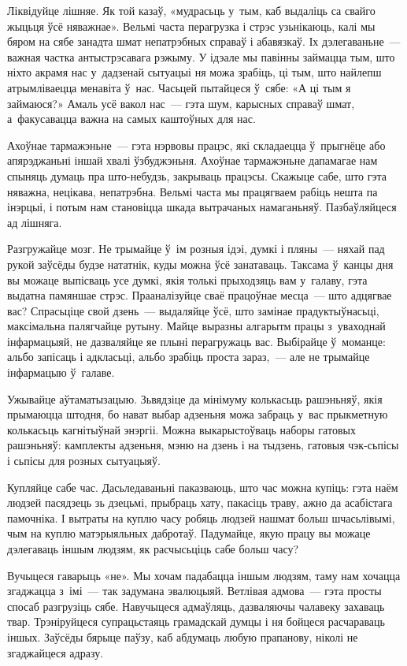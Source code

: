 Ліквідуйце лішняе. Як той казаў, «мудрасьць у~тым, каб выдаліць са свайго жыцьця ўсё няважнае». Вельмі часта перагрузка і стрэс узьнікаюць, калі мы бяром на сябе занадта шмат непатрэбных справаў і абавязкаў. Іх дэлегаваньне~--- важная частка антыстрэсавага рэжыму. У ідэале мы павінны займацца тым, што ніхто акрамя нас у~дадзенай сытуацыі ня можа зрабіць, ці тым, што найлепш атрымліваецца менавіта ў~нас. Часьцей пытайцеся ў~сябе: «А ці тым я займаюся?» Амаль усё вакол нас~--- гэта шум, карысных справаў шмат, а~факусавацца важна на самых каштоўных для нас.

Ахоўнае тармажэньне~--- гэта нэрвовы працэс, які складаецца ў~прыгнёце або апярэджаньні іншай хвалі ўзбуджэньня. Ахоўнае тармажэньне дапамагае нам спыняць думаць пра што-небудзь, закрываць працэсы. Скажыце сабе, што гэта няважна, нецікава, непатрэбна. Вельмі часта мы працягваем рабіць нешта па інэрцыі, і потым нам становіцца шкада вытрачаных намаганьняў. Пазбаўляйцеся ад лішняга.

Разгружайце мозг. Не трымайце ў~ім розныя ідэі, думкі і пляны~--- няхай пад рукой заўсёды будзе нататнік, куды можна ўсё занатаваць. Таксама ў~канцы дня вы можаце выпісваць усе думкі, якія толькі прыходзяць вам у~галаву, гэта выдатна памяншае стрэс. Прааналізуйце сваё працоўнае месца~--- што адцягвае вас? Спрасьціце свой дзень~--- выдаляйце ўсё, што замінае прадуктыўнасьці, максімальна палягчайце рутыну. Майце выразны алгарытм працы з~уваходнай інфармацыяй, не дазваляйце яе плыні перагружаць вас. Выбірайце ў~моманце: альбо запісаць і адкласьці, альбо зрабіць проста зараз,~--- але не трымайце інфармацыю ў~галаве.

Ужывайце аўтаматызацыю. Зьвядзіце да мінімуму колькасьць рашэньняў, якія прымаюцца штодня, бо нават выбар адзеньня можа забраць у~вас прыкметную колькасьць кагнітыўнай энэргіі. Можна выкарыстоўваць наборы гатовых рашэньняў: камплекты адзеньня, мэню на дзень і на тыдзень, гатовыя чэк-сьпісы і сьпісы для розных сытуацыяў.

Купляйце сабе час. Дасьледаваньні паказваюць, што час можна купіць: гэта наём людзей пасядзець зь дзецьмі, прыбраць хату, пакасіць траву, ажно да асабістага памочніка. І вытраты на куплю часу робяць людзей нашмат больш шчасьлівымі, чым на куплю матэрыяльных дабротаў. Падумайце, якую працу вы можаце дэлегаваць іншым людзям, як расчысьціць сабе больш часу?

Вучыцеся гаварыць «не». Мы хочам падабацца іншым людзям, таму нам хочацца згаджацца з~імі~--- так задумана эвалюцыяй. Ветлівая адмова~--- гэта просты спосаб разгрузіць сябе. Навучыцеся адмаўляць, дазваляючы чалавеку захаваць твар. Трэніруйцеся супрацьстаяць грамадскай думцы і ня бойцеся расчараваць іншых. Заўсёды бярыце паўзу, каб абдумаць любую прапанову, ніколі не згаджайцеся адразу.

